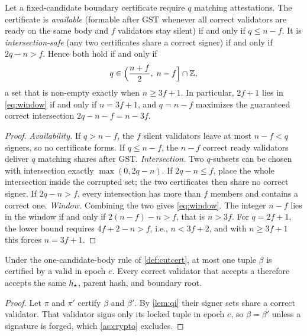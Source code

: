 \begin{theorem}
\label{th:window}
Let a fixed-candidate boundary certificate require $q$ matching attestations. The certificate is
\emph{available} (formable after GST whenever all correct validators are ready on the same body and
$f$ validators stay silent) if and only if $q\le n-f$. It is \emph{intersection-safe} (any two
certificates share a correct signer) if and only if $2q-n>f$. Hence both hold if and only if
\begin{equation}
  q\in\Bigl(\frac{n+f}{2},\;n-f\Bigr]\cap\mathbb Z ,
  \label{eq:window}
\end{equation}
a set that is non-empty exactly when $n\ge3f+1$. In particular, $2f+1$ lies in \eqref{eq:window}
if and only if $n=3f+1$, and $q=n-f$ maximizes the guaranteed correct intersection $2q-n-f=n-3f$.
\end{theorem}
\begin{proof}
\emph{Availability.} If $q>n-f$, the $f$ silent validators leave at most $n-f<q$ signers, so no
certificate forms. If $q\le n-f$, the $n-f$ correct ready validators deliver $q$ matching shares after
GST.
\emph{Intersection.} Two $q$-subsets can be chosen with intersection exactly $\max(0,2q-n)$. If
$2q-n\le f$, place the whole intersection inside the corrupted set; the two certificates then share no
correct signer. If $2q-n>f$, every intersection has more than $f$ members and contains a correct one.
\emph{Window.} Combining the two gives \eqref{eq:window}. The integer $n-f$ lies in the window if and
only if $2(n-f)-n>f$, that is $n>3f$. For $q=2f+1$, the lower bound requires $4f+2-n>f$, i.e.,
$n<3f+2$, and with $n\ge3f+1$ this forces $n=3f+1$.
\end{proof}

\begin{theorem}
\label{th:unique}
Under the one-candidate-body rule of \cref{def:cutcert}, at most one tuple $\beta$ is certified by a
valid \CutCert{} in epoch $e$. Every correct validator that accepts a \CutCert{} therefore accepts the
same $h_{\star}$, parent hash, and boundary root.
\end{theorem}
\begin{proof}
Let $\pi$ and $\pi'$ certify $\beta$ and $\beta'$. By \cref{lem:qi} their signer sets share a correct
validator. That validator signs only its locked tuple in epoch $e$, so $\beta=\beta'$ unless a
signature is forged, which \cref{as:crypto} excludes.
\end{proof}

